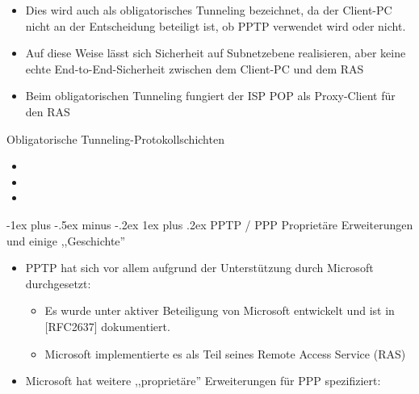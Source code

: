\documentclass[a4paper]{article}
\makeatletter
\renewcommand{\subsubsection}{\@startsection{subsubsection}{3}{0mm}%
 {-1ex plus -.5ex minus -.2ex}%
 {1ex plus .2ex}%
 {\normalfont\small\bfseries}}
\makeatother
\begin{document}
\begin{multicols}{3}
\begin{itemize}
\begin{itemize}
                        \begin{itemize}
                            \item
                                  Dies wird auch als obligatorisches Tunneling bezeichnet, da der
                                  Client-PC nicht an der Entscheidung beteiligt ist, ob PPTP
                                  verwendet wird oder nicht.
                            \item
                                  Auf diese Weise lässt sich Sicherheit auf Subnetzebene
                                  realisieren, aber keine echte End-to-End-Sicherheit zwischen dem
                                  Client-PC und dem RAS
                            \item
                                  Beim obligatorischen Tunneling fungiert der ISP POP als
                                  Proxy-Client für den RAS
                        \end{itemize}
              \end{itemize}
    \end{itemize}

    Obligatorische Tunneling-Protokollschichten

    \begin{itemize}
        \item
        \item
        \item
    \end{itemize}


    \subsubsection{PPTP / PPP Proprietäre Erweiterungen und einige
        ,,Geschichte''}

    \begin{itemize}
        \item
              PPTP hat sich vor allem aufgrund der Unterstützung durch Microsoft
              durchgesetzt:

              \begin{itemize}
                  \item
                        Es wurde unter aktiver Beteiligung von Microsoft entwickelt und ist
                        in {[}RFC2637{]} dokumentiert.
                  \item
                        Microsoft implementierte es als Teil seines Remote Access Service
                        (RAS)
              \end{itemize}
        \item
              Microsoft hat weitere ,,proprietäre'' Erweiterungen für PPP
              spezifiziert:


\end{itemize}
\end{multicols}
\end{document}
